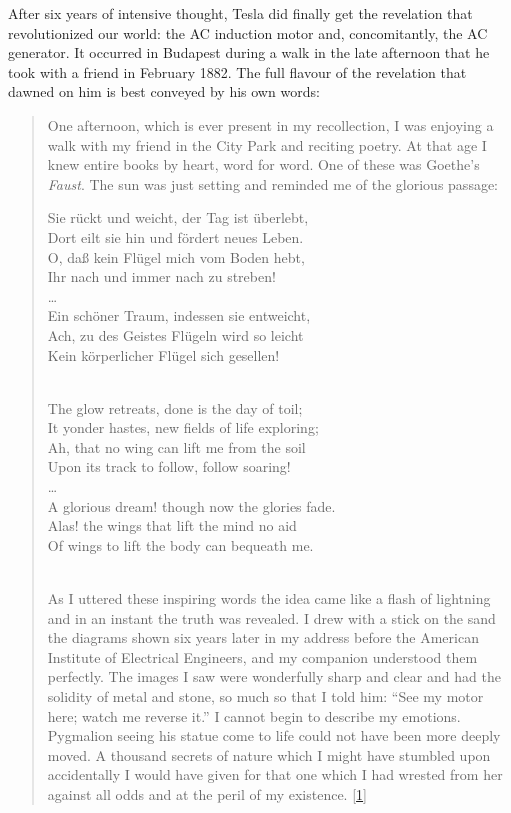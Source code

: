 \documentclass[
  a4paper,
]{article}
\begin{document}
After six years of intensive thought, Tesla did finally get the
revelation that revolutionized our world: the AC induction motor and,
concomitantly, the AC generator. It occurred in Budapest during a walk
in the late afternoon that he took with a friend in February 1882. The
full flavour of the revelation that dawned on him is best conveyed by
his own words:

\begin{quote}
One afternoon, which is ever present in my recollection, I was enjoying
a walk with my friend in the City Park and reciting poetry. At that age
I knew entire books by heart, word for word. One of these was Goethe's
\emph{Faust}. The sun was just setting and reminded me of the glorious
passage:

Sie rückt und weicht, der Tag ist überlebt,\\
Dort eilt sie hin und fördert neues Leben.\\
O, daß kein Flügel mich vom Boden hebt,\\
Ihr nach und immer nach zu streben!\\
\ldots{}\\
Ein schöner Traum, indessen sie entweicht,\\
Ach, zu des Geistes Flügeln wird so leicht\\
Kein körperlicher Flügel sich gesellen!\\
\strut \\
The glow retreats, done is the day of toil;\\
It yonder hastes, new fields of life exploring;\\
Ah, that no wing can lift me from the soil\\
Upon its track to follow, follow soaring!\\
\ldots{}\\
A glorious dream! though now the glories fade.\\
Alas! the wings that lift the mind no aid\\
Of wings to lift the body can bequeath me.\\
\strut \\

As I uttered these inspiring words the idea came like a flash of
lightning and in an instant the truth was revealed. I drew with a stick
on the sand the diagrams shown six years later in my address before the
American Institute of Electrical Engineers, and my companion understood
them perfectly. The images I saw were wonderfully sharp and clear and
had the solidity of metal and stone, so much so that I told him: ``See
my motor here; watch me reverse it.'' I cannot begin to describe my
emotions. Pygmalion seeing his statue come to life could not have been
more deeply moved. A thousand secrets of nature which I might have
stumbled upon accidentally I would have given for that one which I had
wrested from her against all odds and at the peril of my existence.
{[}\protect\hyperlink{ref-john83}{1}{]}
\end{quote}
\end{document}
